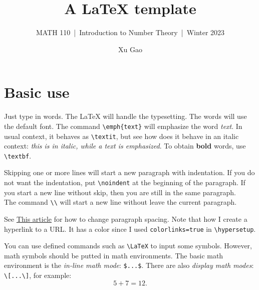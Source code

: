 \documentclass[11pt]{article}
\title{A {\LaTeX} template}
\author{Xu Gao}
\subtitle{MATH 110~|~Introduction to Number Theory~|~Winter 2023}
\theoremstyle{plain}
\theoremstyle{definition}
\theoremstyle{remark}
\numberwithin{equation}{problem}
\begin{document}
\maketitle

\section{Basic use}
Just type in words. The {\LaTeX} will handle the typesetting. 
The words will use the default font. 
The command \verb|\emph{text}| will emphasize the word \emph{text}. 
In usual context, it behaves as \verb|\textit|, but see how does it behave in an italic context: \textit{this is in italic, while a \emph{text} is emphasized}. 
To obtain \textbf{bold} words, use \verb|\textbf|. 

Skipping one or more lines will start a new paragraph with indentation. 
If you do not want the indentation, put \verb|\noindent| at the beginning of the paragraph. 
If you start a new line without skip, then you are still in the same paragraph. \\
The command \verb|\\| will start a new line without leave the current paragraph. 

See \href{https://www.overleaf.com/learn/latex/Articles/How_to_change_paragraph_spacing_in_LaTeX}{This article} for how to change paragraph spacing. Note that how I create a hyperlink to a URL. It has a color since I used \verb|colorlinks=true| in \verb|\hypersetup|.

You can use defined commands such as \verb|\LaTeX| to input some symbols. 
However, math symbols should be putted in math environments. 
The basic math environment is the \emph{in-line math mode}: \verb|$...$|. There are also \emph{display math modes}: \verb|\[...\]|, for example:
\[
	5+7=12.
\] 
\end{document}
